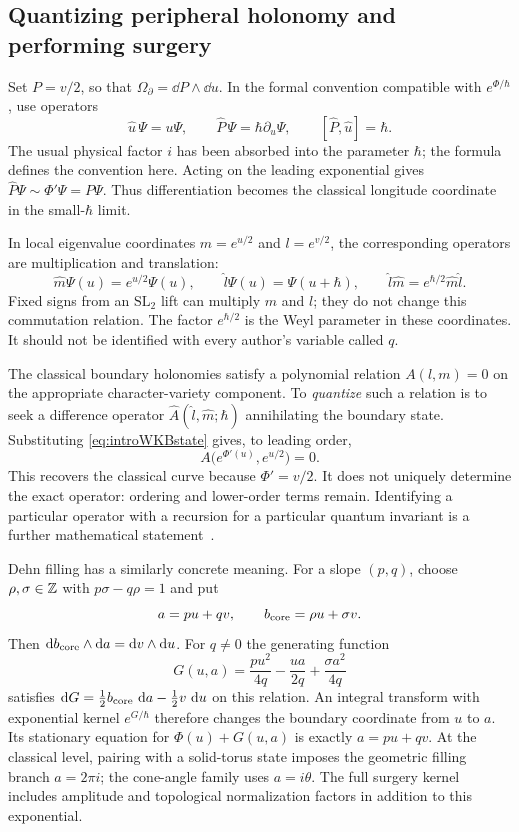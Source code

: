 \subsection{Quantizing peripheral holonomy and performing surgery}
\label{sec:introquantization}

Set $P=v/2$, so that $\Omega_\partial=\dd P\wedge\dd u$.
In the formal convention compatible with
$e^{\Phi/\hbar}$, use operators
\begin{equation}
 \widehat u\,\Psi=u\Psi,\qquad
 \widehat P\,\Psi=\hbar\partial_u\Psi,
 \qquad [\widehat P,\widehat u]=\hbar.
 \label{eq:introcommutator}
\end{equation}
The usual physical factor $i$ has been absorbed into the parameter
$\hbar$; the formula defines the convention here. Acting on the
leading exponential gives $\widehat P\Psi\sim\Phi'\Psi=P\Psi$.
Thus differentiation becomes the classical longitude coordinate
in the small-$\hbar$ limit.

In local eigenvalue coordinates $m=e^{u/2}$ and $l=e^{v/2}$,
the corresponding operators are multiplication and translation:
\[
 \widehat m\Psi(u)=e^{u/2}\Psi(u),\qquad
 \widehat l\Psi(u)=\Psi(u+\hbar),\qquad
 \widehat l\widehat m=e^{\hbar/2}\widehat m\widehat l.
\]
Fixed signs from an $\mathrm{SL}_2$ lift can multiply $m$ and $l$;
they do not change this commutation relation. The factor
$e^{\hbar/2}$ is the Weyl parameter in these coordinates. It should
not be identified with every author's variable called $q$.

The classical boundary holonomies satisfy a polynomial relation
$A(l,m)=0$ on the appropriate character-variety component. To
\emph{quantize} such a relation is to seek a difference operator
$\widehat A(\widehat l,\widehat m;\hbar)$ annihilating the boundary
state. Substituting \eqref{eq:introWKBstate} gives, to leading order,
\[
 A\bigl(e^{\Phi'(u)},e^{u/2}\bigr)=0.
\]
This recovers the classical curve because $\Phi'=v/2$. It does not
uniquely determine the exact operator: ordering and lower-order
terms remain. Identifying a particular operator with a recursion
for a particular quantum invariant is a further mathematical
statement~\cite{GukovApoly,DimofteQuantumRS}.

Dehn filling has a similarly concrete meaning. For a slope $(p,q)$,
choose $\rho,\sigma\in\mathbb Z$ with $p\sigma-q\rho=1$ and put
\[
 a=pu+qv,\qquad b_{\rm core}=\rho u+\sigma v.
\]
Then $\mathop{}\!\mathrm d b_{\rm core}\wedge\mathop{}\!\mathrm d a=\mathop{}\!\mathrm d v\wedge\mathop{}\!\mathrm d u$. For $q\ne0$
the generating function
\begin{equation}
 G(u,a)=\frac{pu^2}{4q}-\frac{ua}{2q}
                    +\frac{\sigma a^2}{4q}
 \label{eq:introfillingkernel}
\end{equation}
satisfies $\mathop{}\!\mathrm d G=\frac12b_{\rm core}\,\mathop{}\!\mathrm d a-\frac12v\,\mathop{}\!\mathrm d u$ on
this relation. An integral transform with exponential kernel
$e^{G/\hbar}$ therefore changes the boundary coordinate from $u$
to $a$. Its stationary equation for $\Phi(u)+G(u,a)$ is exactly
$a=pu+qv$. At the classical level, pairing with a solid-torus state imposes
the geometric filling branch $a=2\pi i$; the cone-angle family
uses $a=i\theta$.
The full surgery kernel includes amplitude and topological
normalization factors in addition to this exponential.

